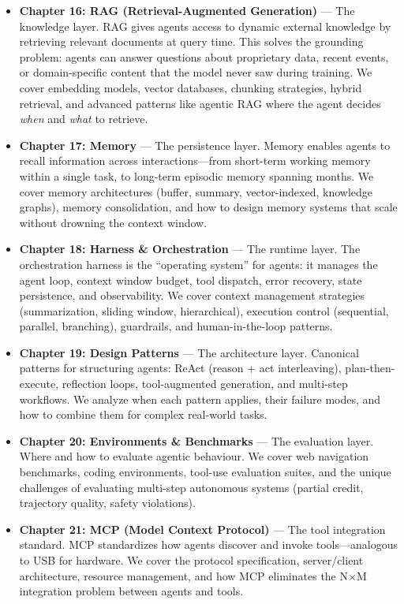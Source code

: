 \begin{itemize}
  \item \textbf{Chapter 16: RAG (Retrieval-Augmented Generation)} --- The knowledge layer. RAG gives agents access to dynamic external knowledge by retrieving relevant documents at query time. This solves the grounding problem: agents can answer questions about proprietary data, recent events, or domain-specific content that the model never saw during training. We cover embedding models, vector databases, chunking strategies, hybrid retrieval, and advanced patterns like agentic RAG where the agent decides \emph{when} and \emph{what} to retrieve.
  \item \textbf{Chapter 17: Memory} --- The persistence layer. Memory enables agents to recall information across interactions---from short-term working memory within a single task, to long-term episodic memory spanning months. We cover memory architectures (buffer, summary, vector-indexed, knowledge graphs), memory consolidation, and how to design memory systems that scale without drowning the context window.
  \item \textbf{Chapter 18: Harness \& Orchestration} --- The runtime layer. The orchestration harness is the ``operating system'' for agents: it manages the agent loop, context window budget, tool dispatch, error recovery, state persistence, and observability. We cover context management strategies (summarization, sliding window, hierarchical), execution control (sequential, parallel, branching), guardrails, and human-in-the-loop patterns.
  \item \textbf{Chapter 19: Design Patterns} --- The architecture layer. Canonical patterns for structuring agents: ReAct (reason + act interleaving), plan-then-execute, reflection loops, tool-augmented generation, and multi-step workflows. We analyze when each pattern applies, their failure modes, and how to combine them for complex real-world tasks.
  \item \textbf{Chapter 20: Environments \& Benchmarks} --- The evaluation layer. Where and how to evaluate agentic behaviour. We cover web navigation benchmarks, coding environments, tool-use evaluation suites, and the unique challenges of evaluating multi-step autonomous systems (partial credit, trajectory quality, safety violations).
  \item \textbf{Chapter 21: MCP (Model Context Protocol)} --- The tool integration standard. MCP standardizes how agents discover and invoke tools---analogous to USB for hardware. We cover the protocol specification, server/client architecture, resource management, and how MCP eliminates the N$\times$M integration problem between agents and tools.

\end{itemize}
